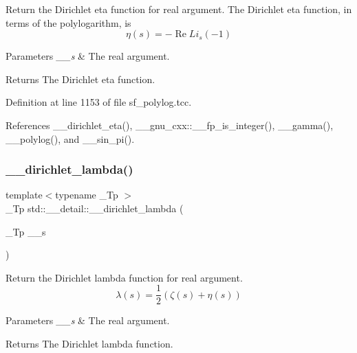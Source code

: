 Return the Dirichlet eta function for real argument. The Dirichlet eta function, in terms of the polylogarithm, is \[ \renewcommand\Re{\operatorname{Re}} \renewcommand\Im{\operatorname{Im}} \eta(s) = -\Re{Li_s(-1)} \]


\begin{DoxyParams}{Parameters}
{\em \+\_\+\+\_\+s} & The real argument. \\
\hline
\end{DoxyParams}
\begin{DoxyReturn}{Returns}
The Dirichlet eta function. 
\end{DoxyReturn}


Definition at line 1153 of file sf\+\_\+polylog.\+tcc.



References \+\_\+\+\_\+dirichlet\+\_\+eta(), \+\_\+\+\_\+gnu\+\_\+cxx\+::\+\_\+\+\_\+fp\+\_\+is\+\_\+integer(), \+\_\+\+\_\+gamma(), \+\_\+\+\_\+polylog(), and \+\_\+\+\_\+sin\+\_\+pi().

\mbox{\label{namespacestd_1_1____detail_a6ee8ae93ba65207de8ef3d6bb162b192}} 
\subsubsection{\texorpdfstring{\+\_\+\+\_\+dirichlet\+\_\+lambda()}{\_\_dirichlet\_lambda()}}
{\footnotesize\ttfamily template$<$typename \+\_\+\+Tp $>$ \\
\+\_\+\+Tp std\+::\+\_\+\+\_\+detail\+::\+\_\+\+\_\+dirichlet\+\_\+lambda (\begin{DoxyParamCaption}\item[{\+\_\+\+Tp}]{\+\_\+\+\_\+s }\end{DoxyParamCaption})}

Return the Dirichlet lambda function for real argument. \[ \lambda(s) = \frac{1}{2}(\zeta(s) + \eta(s)) \]


\begin{DoxyParams}{Parameters}
{\em \+\_\+\+\_\+s} & The real argument. \\
\hline
\end{DoxyParams}
\begin{DoxyReturn}{Returns}
The Dirichlet lambda function. 
\end{DoxyReturn}



